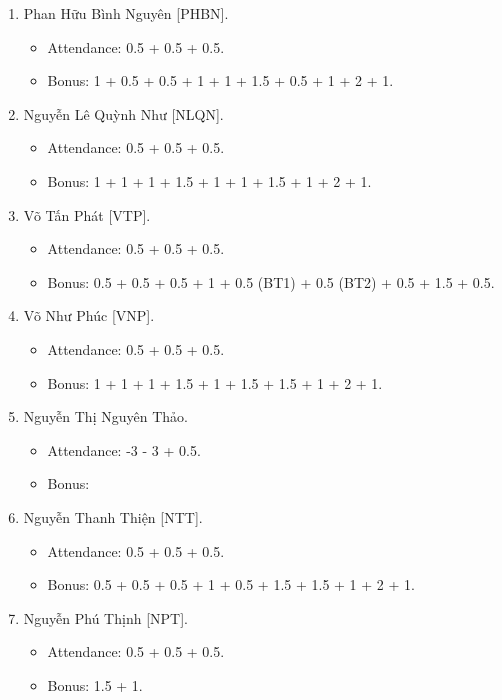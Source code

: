 \documentclass{article}
\begin{document}
\begin{enumerate}
\begin{itemize}
    \end{itemize}
    \item {\sc Phan Hữu Bình Nguyên [PHBN].}
    \begin{itemize}
        \item Attendance: 0.5 + 0.5 + 0.5.
        \item Bonus: 1 + 0.5 + 0.5 + 1 + 1 + 1.5 + 0.5 + 1 + 2 + 1.
    \end{itemize}
    \item {\sc Nguyễn Lê Quỳnh Như [NLQN].}
    \begin{itemize}
        \item Attendance: 0.5 + 0.5 + 0.5.
        \item Bonus: 1 + 1 + 1 + 1.5 + 1 + 1 + 1.5 + 1 + 2 + 1.
    \end{itemize}
    \item {\sc Võ Tấn Phát [VTP].}
    \begin{itemize}
        \item Attendance: 0.5 + 0.5 + 0.5.
        \item Bonus: 0.5 + 0.5 + 0.5 + 1 + 0.5 (BT1) + 0.5 (BT2) + 0.5 + 1.5 + 0.5.
    \end{itemize}
    \item {\sc Võ Như Phúc [VNP].}
    \begin{itemize}
        \item Attendance: 0.5 + 0.5 + 0.5.
        \item Bonus: 1 + 1 + 1 + 1.5 + 1 + 1.5 + 1.5 + 1 + 2 + 1.
    \end{itemize}
    \item {\sc Nguyễn Thị Nguyên Thảo.}
    \begin{itemize}
        \item Attendance: -3 - 3 + 0.5.
        \item Bonus:
    \end{itemize}
    \item {\sc Nguyễn Thanh Thiện [NTT].}
    \begin{itemize}
        \item Attendance: 0.5 + 0.5 + 0.5.
        \item Bonus: 0.5 + 0.5 + 0.5 + 1 + 0.5 + 1.5 + 1.5 + 1 + 2 + 1.
    \end{itemize}
    \item {\sc Nguyễn Phú Thịnh [NPT].}
    \begin{itemize}
        \item Attendance: 0.5 + 0.5 + 0.5.
        \item Bonus: 1.5 + 1.

\end{itemize}
\end{enumerate}
\end{document}
